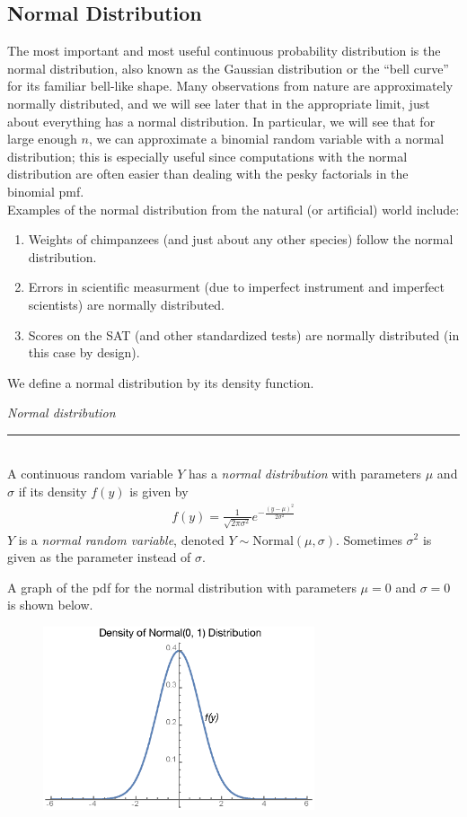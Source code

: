 \documentclass[12pt]{article}
\theoremstyle{definition}
\theoremstyle{remark}
\begin{document}
\subsection{Normal Distribution}
The most important and most useful continuous probability distribution is the normal distribution, also known as the Gaussian distribution or the ``bell curve'' for its familiar bell-like shape. Many observations from nature are approximately normally distributed, and we will see later that in the appropriate limit, just about everything has a normal distribution. In particular, we will see that for large enough $n$, we can approximate a binomial random variable with a normal distribution; this is especially useful since computations with the normal distribution are often easier than dealing with the pesky factorials in the binomial pmf.\\

Examples of the normal distribution from the natural (or artificial) world include:
\begin{enumerate}
\item Weights of chimpanzees (and just about any other species) follow the normal distribution.
\item Errors in scientific measurment (due to imperfect instrument and imperfect scientists) are normally distributed.
\item Scores on the SAT (and other standardized tests) are normally distributed (in this case by design).
\end{enumerate}

We define a normal distribution by its density function.

\begin{framed}
\emph{Normal distribution}\\
  \rule{\dimexpr{}\fboxrule}{.1pt} \\
A continuous random variable $Y$ has a \emph{normal distribution} with parameters $\mu$ and $\sigma$ if its density $f(y)$ is given by
\begin{align*}
f(y) = \frac{1}{\sqrt{2 \pi \sigma^2}} e^{-\frac{(y - \mu)^2}{2 \sigma^2}}
\end{align*}
$Y$ is a \emph{normal random variable}, denoted $Y \sim \text{Normal}(\mu, \sigma)$. Sometimes $\sigma^2$ is given as the parameter instead of $\sigma$.
\end{framed}

A graph of the pdf for the normal distribution with parameters $\mu = 0$ and $\sigma = 0$ is shown below.
\begin{figure}[H]
\centering
\includegraphics[width=8cm]{normalpdf2.eps}
\end{figure}
\end{document}
